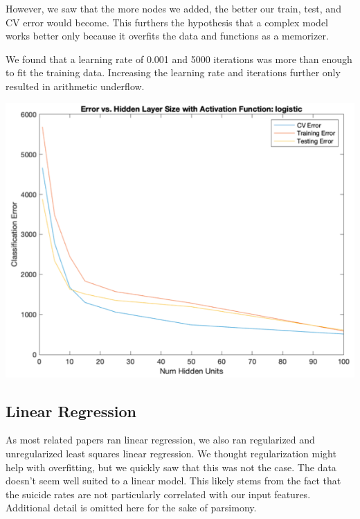 \documentclass{article}
\begin{document}
\begin{multicols}{2}
However, we saw that the more nodes we added, the better our train, test, and CV error would become. This furthers the hypothesis that a complex model works better only because it overfits the data and functions as a memorizer. 

We found that a learning rate of 0.001 and 5000 iterations was more than enough to fit the training data. Increasing the learning rate and iterations further only resulted in arithmetic underflow. 


\begingroup
    \includegraphics[width=\columnwidth]{neur-net.png}
    \begin{spacing}{1.2}
    \label{fig:neural_net_fig} 
    \end{spacing}
\endgroup


\subsection{Linear Regression} 
As most related papers ran linear regression, we also ran regularized and unregularized least squares linear regression. We thought regularization might help with overfitting, but we quickly saw that this was not the case. The data doesn't seem well suited to a linear model. This likely stems from the fact that the suicide rates are not particularly correlated with our input features. Additional detail is omitted here for the sake of parsimony. 



\end{multicols}
\end{document}
